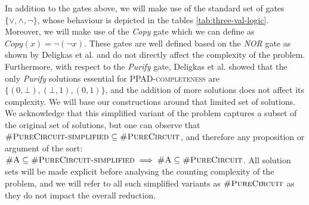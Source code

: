 In addition to the gates above, we will make use of the standard set of gates $\{\vee, \wedge, \neg\}$,
whose behaviour is depicted in the tables \ref{tab:three-val-logic}.
Moreover, we will make use of the \textit{Copy} gate which we can define as $\textit{Copy}(x) = \neg (\neg x)$.
These gates are well defined based on the \textit{NOR} gate as shown by Deligkas et al. \cite{deligkas_PureCircuitTightInapproximability_2024}
and do not directly affect the complexity of the problem.
Furthermore, with respect to the \textit{Purify} gate,
Deligkas et al. \cite{deligkas_PureCircuitTightInapproximability_2024} showed that the only \textit{Purify} solutions essential
for \textsc{PPAD-completeness} are $\{(0,\bot), (\bot,1), (0,1)\}$, and the addition of more solutions does not affect its complexity.
We will base our constructions around that limited set of solutions.
We acknowledge that this simplified variant of the problem captures a subset of the original set of solutions, but
one can observe that $\textsc{\#PureCircuit-simplified} \subseteq \textsc{\#PureCircuit}$,
and therefore any proposition or argument of the sort:
$\textsc{\#A} \subseteq \textsc{\#PureCircuit-simplified} \implies \textsc{\#A} \subseteq \textsc{\#PureCircuit}$.
All solution sets will be made explicit before analysing the counting complexity of the problem,
and we will refer to all such simplified variants as $\textsc{\#PureCircuit}$ as they do not impact
the overall reduction.


